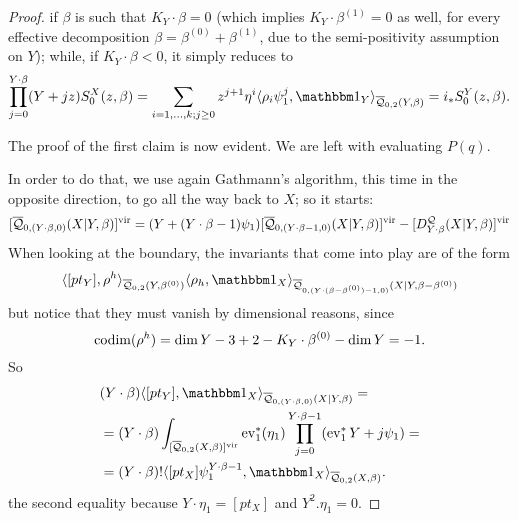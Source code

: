\begin{proof}
\begin{comment}
\begin{align*}
\prod_{j=0}^{Y\cdot\beta}(Y+jz) S_0^X(z,\beta) = T_{(Y\cdot\beta)}^{X|Y}(z,\beta) & = \sum_{i=1,\ldots,k;j\geq 0}z^{j+1}\eta^i\langle \rho_i\psi_1^j,\mathbbm 1_{Y}\rangle_{\Q{0}{2}{Y}{\beta}} \\
 &+\sum_{\substack{0<\beta^{(0)}<\beta \\ \beta^{(0)}+\beta^{(1)}=\beta}}z^{j+1}\eta^i\langle \rho_i\psi_1^j,\mathbbm 1_{Y}\rangle_{\Q{0}{2}{Y}{\beta^{(0)}}}(Y\cdot\beta^{(1)})\langle [pt_Y],\mathbbm 1_{X}\rangle_{\Q{0}{(Y\cdot\beta^{(1)},0)}{X|Y}{\beta^{(1)}}}\\
 &+\eta^1(Y\cdot\beta)\langle [pt_Y],\mathbbm 1_{X}\rangle_{\Q{0}{(Y\cdot\beta,0)}{X|Y}{\beta}}
\end{align*}
\end{comment}
if $\beta$ is such that $K_Y\cdot\beta=0$ (which implies $K_Y\cdot\beta^{(1)}=0$ as well, for every effective decomposition $\beta=\beta^{(0)}+\beta^{(1)}$, due to the semi-positivity assumption on $Y$); while, if $K_Y\cdot\beta<0$, it simply reduces to
\[
 \prod_{j=0}^{Y\cdot\beta}(Y+jz) S_0^X(z,\beta)= \sum_{i=1,\ldots,k;j\geq 0}z^{j+1}\eta^i\langle \rho_i\psi_1^j,\mathbbm 1_{Y}\rangle_{\Q{0}{2}{Y}{\beta}} = i_*S_0^Y(z,\beta).
\]


The proof of the first claim is now evident. We are left with evaluating $P(q)$.

In order to do that, we use again Gathmann's algorithm, this time in the opposite direction, to go all the way back to $X$; so it starts:
\[
 [\overline{\mathcal Q}_{0,(Y \cdot \beta,0)}(X|Y,\beta)]^\text{vir}=(Y+(Y\cdot\beta-1)\psi_1)[\overline{\mathcal Q}_{0,(Y\cdot\beta-1,0)}(X|Y,\beta)]^\text{vir}-[D_{Y\cdot\beta}^{\mathcal Q}(X|Y,\beta)]^\text{vir}
\]
When looking at the boundary, the invariants that come into play are of the form
\[
 \langle [pt_Y],\rho^h\rangle_{\Q{0}{2}{Y}{\beta^{(0)}}}\langle \rho_h,\mathbbm 1_{X}\rangle_{\Q{0}{(Y\cdot(\beta-\beta^{(0)})-1,0)}{X|Y}{\beta-\beta^{(0)}}}
\]
but notice that they must vanish by dimensional reasons, since
\[
 \operatorname{codim}(\rho^h)=\dim Y-3+2-K_Y\cdot\beta^{(0)}-\dim Y=-1.
\]
So
\begin{align*}
 & (Y\cdot\beta)\langle [pt_Y],\mathbbm 1_{X}\rangle_{\Q{0}{(Y\cdot\beta,0)}{X|Y}{\beta}} = \\
 & = (Y\cdot\beta)\int_{[\Q{0}{2}{X}{\beta}]^{\text{vir}}}\ev_1^*(\eta_1)\prod_{j=0}^{Y\cdot\beta-1}(\ev_1^*Y+j\psi_1) = \\
 & = (Y\cdot\beta)!\langle[pt_X]\psi_1^{Y\cdot\beta-1},\mathbbm 1_X\rangle_{\Q{0}{2}{X}{\beta}}.
\end{align*}
the second equality because $Y\cdot\eta_1=[pt_X]$ and $Y^2.\eta_1=0$.
\end{proof}

